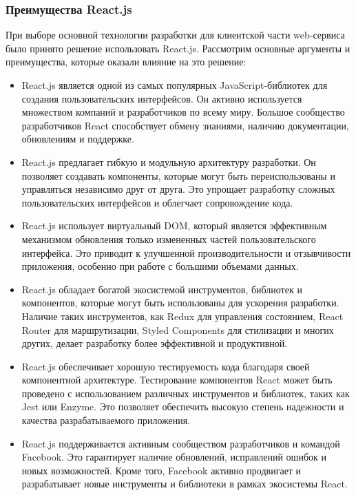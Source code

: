\subsubsection{Преимущества React.js}

При выборе основной технологии разработки для клиентской части web-сервиса было принято решение использовать React.js. Рассмотрим основные аргументы и преимущества, которые оказали влияние на это решение:

\begin{itemize}
    \item React.js является одной из самых популярных JavaScript-библиотек для создания пользовательских интерфейсов. Он активно используется множеством компаний и разработчиков по всему миру. Большое сообщество разработчиков React способствует обмену знаниями, наличию документации, обновлениям и поддержке.
    \item React.js предлагает гибкую и модульную архитектуру разработки. Он позволяет создавать компоненты, которые могут быть переиспользованы и управляться независимо друг от друга. Это упрощает разработку сложных пользовательских интерфейсов и облегчает сопровождение кода.
    \item React.js использует виртуальный DOM, который является эффективным механизмом обновления только измененных частей пользовательского интерфейса. Это приводит к улучшенной производительности и отзывчивости приложения, особенно при работе с большими объемами данных.
    \item React.js обладает богатой экосистемой инструментов, библиотек и компонентов, которые могут быть использованы для ускорения разработки. Наличие таких инструментов, как Redux для управления состоянием, React Router для маршрутизации, Styled Components для стилизации и многих других, делает разработку более эффективной и продуктивной.
    \item React.js обеспечивает хорошую тестируемость кода благодаря своей компонентной архитектуре. Тестирование компонентов React может быть проведено с использованием различных инструментов и библиотек, таких как Jest или Enzyme. Это позволяет обеспечить высокую степень надежности и качества разрабатываемого приложения.
    \item React.js поддерживается активным сообществом разработчиков и командой Facebook. Это гарантирует наличие обновлений, исправлений ошибок и новых возможностей. Кроме того, Facebook активно продвигает и разрабатывает новые инструменты и библиотеки в рамках экосистемы React.
\end{itemize}

